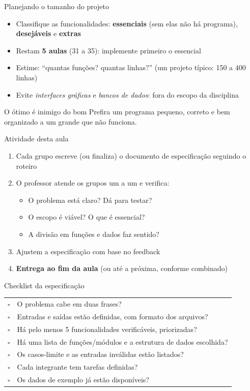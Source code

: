 \documentclass[aspectratio=169,10pt,t]{beamer}
\begin{document}
\begin{frame}{Planejando o tamanho do projeto}
  \begin{itemize}
    \item Classifique as funcionalidades: \textbf{essenciais} (sem elas não há programa), \textbf{desejáveis} e \textbf{extras}
    \item Restam \textbf{5 aulas} (31 a 35): implemente primeiro o essencial
    \item Estime: ``quantas funções? quantas linhas?'' (um projeto típico: 150 a 400 linhas)
    \item Evite \emph{interfaces gráficas} e \emph{bancos de dados}: fora do escopo da disciplina
  \end{itemize}
  \begin{alertblock}{O ótimo é inimigo do bom}
    Prefira um programa pequeno, correto e bem organizado a um grande que não funciona.
  \end{alertblock}
\end{frame}

\begin{frame}{Atividade desta aula}
  \begin{enumerate}
    \item Cada grupo escreve (ou finaliza) o documento de especificação seguindo o roteiro
    \item O professor atende os grupos um a um e verifica:
    \begin{itemize}\small
      \item O problema está claro? Dá para testar?
      \item O escopo é viável? O que é essencial?
      \item A divisão em funções e dados faz sentido?
    \end{itemize}
    \item Ajustem a especificação com base no feedback
    \item \textbf{Entrega ao fim da aula} (ou até a próxima, conforme combinado)
  \end{enumerate}
\end{frame}

\begin{frame}{Checklist da especificação}
  \small
  \begin{tabular}{@{}cl@{}}
    $\square$ & O problema cabe em duas frases?\\
    $\square$ & Entradas e saídas estão definidas, com formato dos arquivos?\\
    $\square$ & Há pelo menos 5 funcionalidades verificáveis, priorizadas?\\
    $\square$ & Há uma lista de funções/módulos e a estrutura de dados escolhida?\\
    $\square$ & Os casos-limite e as entradas inválidas estão listados?\\
    $\square$ & Cada integrante tem tarefas definidas?\\
    $\square$ & Os dados de exemplo já estão disponíveis?\\
  \end{tabular}
\end{frame}
\end{document}
